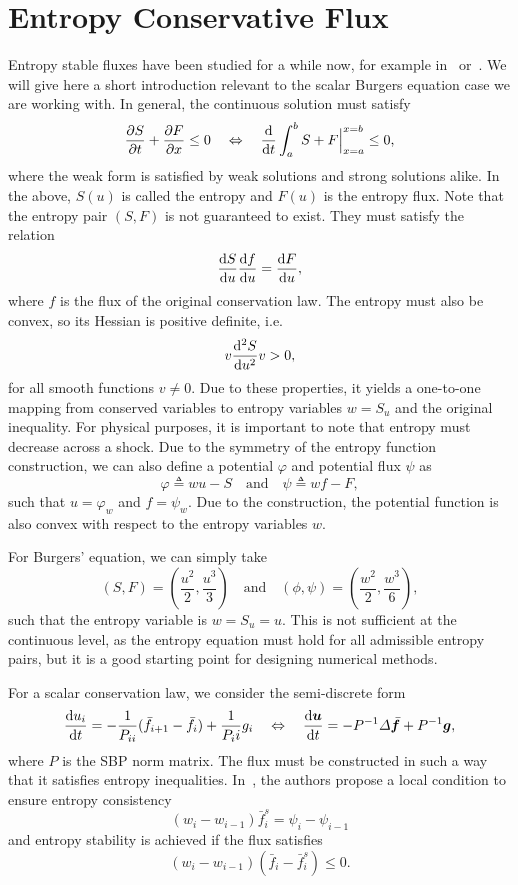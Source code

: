 \documentclass{scrartcl}
\begin{document}

\section{Entropy Conservative Flux} %
\label{ax:entropy}

Entropy stable fluxes have been studied for a while now, for example
in~\cite{Tadmor2003} or~\cite{Ismail2009}. We will give here a short introduction
relevant to the scalar Burgers equation case we are working with. In general,
the continuous solution must satisfy
\[
\dfrac{\partial S}{\partial t} + \dfrac{\partial F}{\partial x} \le 0
\quad \Leftrightarrow \quad
\dfrac{\mathrm{d} }{\mathrm{d} t} \int_a^b S + F\Big|_{x = a}^{x = b} \le 0,
\]
where the weak form is satisfied by weak solutions and strong solutions alike.
In the above, $S(u)$ is called the entropy and $F(u)$ is the entropy flux. Note
that the entropy pair $(S, F)$ is not guaranteed to exist. They must satisfy the
relation
\[
\dfrac{\mathrm{d} S}{\mathrm{d} u} \dfrac{\mathrm{d} f}{\mathrm{d} u} = \dfrac{\mathrm{d} F}{\mathrm{d} u},
\]
where $f$ is the flux of the original conservation law. The entropy must also
be convex, so its Hessian is positive definite, i.e.
\[
v \dfrac{\mathrm{d} ^2S}{\mathrm{d} u^2} v > 0,
\]
for all smooth functions $v \ne 0$. Due to these properties, it yields a one-to-one
mapping from conserved variables to entropy variables $w = S_u$ and the original
inequality. For physical purposes, it is important to note that entropy must
decrease across a shock. Due to the symmetry of the entropy function construction,
we can also define a potential $\varphi$ and potential flux $\psi$ as
\[
\varphi \triangleq w u - S
\quad \text{and} \quad
\psi \triangleq w f - F,
\]
such that $u = \varphi_w$ and $f = \psi_w$. Due to the construction, the potential
function is also convex with respect to the entropy variables $w$.

For Burgers' equation, we can simply take
\[
(S, F) = \left(\frac{u^2}{2}, \frac{u^3}{3}\right)
\quad \text{and} \quad
(\phi, \psi) = \left(\frac{w^2}{2}, \frac{w^3}{6}\right),
\]
such that the entropy variable is $w = S_u = u$. This is not sufficient at the
continuous level, as the entropy equation must hold for all admissible entropy
pairs, but it is a good starting point for designing numerical methods.

For a scalar conservation law, we consider the semi-discrete form
\[
\od{u_i}{t} = -\frac{1}{P_{ii}} (\bar{f}_{i + 1} - \bar{f}_i) + \frac{1}{P_ii} g_i
\quad \Leftrightarrow \quad
\od{\vect{u}}{t} = -P^{-1} \Delta \bar{\vect{f}} + P^{-1} \vect{g},
\]
where $P$ is the SBP norm matrix. The flux must be constructed in such a way
that it satisfies entropy inequalities. In~\cite{Fisher2013}, the authors
propose a local condition to ensure entropy consistency
\[
(w_i - w_{i - 1}) \bar{f}^s_i = \psi_i - \psi_{i - 1}
\]
and entropy stability is achieved if the flux satisfies
\[
(w_i - w_{i - 1}) (\bar{f}_i - \bar{f}^s_i) \le 0.
\]
\end{document}
